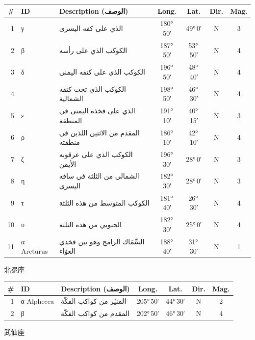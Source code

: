 \documentclass[9pt,a4paper]{extarticle}
\newcommand{\ar}[1]{{\arabicfont\textarabic{#1}}}
\begin{document}
\begin{longtable}{r l >{\raggedright\arraybackslash}p{6.7cm} c c c c}
\toprule \# & ID & Description (\ar{الوصف}) & Long. & Lat. & Dir. & Mag.\\ \midrule\endhead
1 & γ & \ar{الذي على كفه اليسرى} & 180°\,50′ & 49°\,0′ & N & 3\\
2 & β & \ar{الكوكب الذي على رأسه} & 187°\,50′ & 53°\,50′ & N & 4\\
3 & δ & \ar{الكوكب الذي على كتفه اليمنى} & 196°\,50′ & 48°\,40′ & N & 4\\
4 &  & \ar{الكوكب الذي تحت كتفه الشمالية} & 198°\,50′ & 46°\,30′ & N & 4\\
5 & ε & \ar{الذي على فخذه اليمنى في المنطقة} & 191°\,10′ & 40°\,15′ & N & 3\\
6 & ρ & \ar{المقدم من الاثنين اللذين في منطقته} & 186°\,10′ & 42°\,10′ & N & 4\\
7 & ζ & \ar{الكوكب الذي على عرقوبه الأيمن} & 196°\,30′ & 28°\,0′ & N & 3\\
8 & η & \ar{الشمالي من الثلثة في ساقه اليسرى} & 182°\,30′ & 28°\,0′ & N & 3\\
9 & τ & \ar{الكوكب المتوسط من هذه الثلثة} & 181°\,40′ & 26°\,30′ & N & 4\\
10 & υ & \ar{الجنوبي من هذه الثلثة} & 182°\,30′ & 25°\,0′ & N & 4\\
11 & α Arcturus & \ar{السِّمَاك الرامح وهو بين فخذي العوّاء} & 188°\,40′ & 31°\,30′ & N & 1\\
\bottomrule\end{longtable}
\vspace{4pt}\quad\ar{الفكة}\quad 北冕座
\begin{longtable}{r l >{\raggedright\arraybackslash}p{6.7cm} c c c c}
\toprule \# & ID & Description (\ar{الوصف}) & Long. & Lat. & Dir. & Mag.\\ \midrule\endhead
1 & α Alphecca & \ar{المنيّر من كواكب الفكّة} & 205°\,50′ & 44°\,30′ & N & 2\\
2 & β & \ar{المقدم من كواكب الفكّة} & 202°\,50′ & 46°\,30′ & N & 4\\
\bottomrule\end{longtable}
\vspace{4pt}\quad\ar{الجاثي}\quad 武仙座
\end{document}
